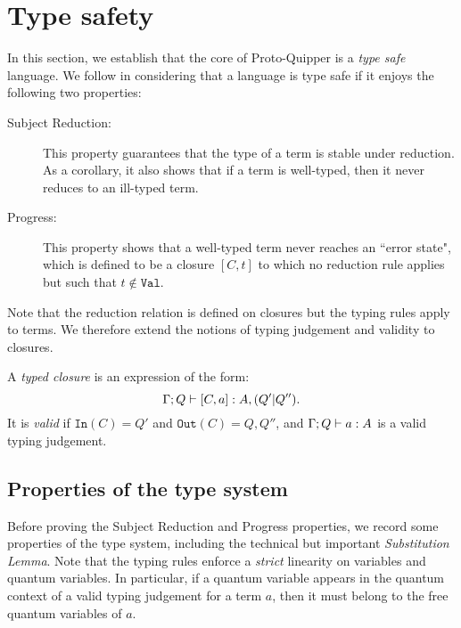 \documentclass[twoside]{article}
\begin{document}
\clearpage
\section{Type safety}\label{sec-type-safety}

In this section, we establish that the core of  Proto-Quipper 
is a \emph{type safe} language. We follow \cite{WrFe94} in 
considering that a language is type safe if it enjoys the 
following two properties: 
\begin{description}
  \item[Subject Reduction:] This property guarantees 
  that the type of a term is stable under reduction.
  As a corollary, it also shows that if a term is 
  well-typed, then it never reduces to an ill-typed 
  term.
  \item[Progress:] This property shows that a 
  well-typed term never reaches an ``error state", 
  which is defined to be a closure $[C,t]$ to which 
  no reduction rule applies but such that 
  $t\notin \mathtt{Val}$. 
\end{description}
Note that the reduction relation is defined on closures 
but the typing rules apply to terms. We therefore extend 
the notions of typing judgement and validity to closures.

\begin{definition}
A \emph{typed closure} is an expression of the form:
\[
\Gamma;Q\vdash [C,a]:A,(Q'|Q'').
\]
It is \emph{valid} if $\mathtt{In}(C)=Q'$ and $\mathtt{Out}(C)=Q,Q''$,
and $\Gamma;Q\vdash a:A$ is a valid typing judgement.
\end{definition}

\subsection{Properties of the type system}

Before proving the Subject Reduction and Progress properties, we
record some properties of the type system, including the technical but
important \emph{Substitution Lemma}. Note that the typing rules
enforce a \emph{strict} linearity on variables and quantum
variables. In particular, if a quantum variable appears in the quantum
context of a valid typing judgement for a term $a$, then it must
belong to the free quantum variables of $a$.
\end{document}

